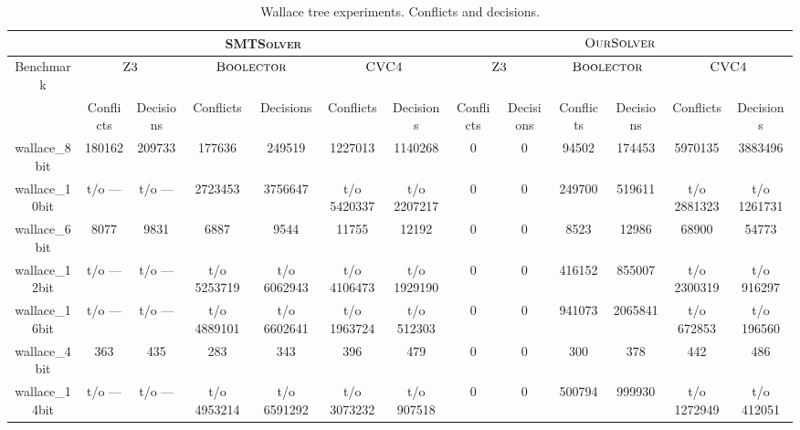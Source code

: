 \begin{table}[t]
\centering
\caption{Wallace tree experiments. Conflicts and decisions.}
\label{my-label}
\begin{tabular}{|c|c|c|c|c|c|c|c|c|c|c|c|c|}
\hline
               & \multicolumn{6}{c|}{\textsc{SMTSolver}}                                                            & \multicolumn{6}{c|}{$\textsc{OurSolver}$}                                                                      \\ \hline
Benchmark      & \multicolumn{2}{c|}{$\textsc{Z3}$} & \multicolumn{2}{c|}{$\textsc{Boolector}$} & \multicolumn{2}{c|}{$\textsc{CVC4}$} & \multicolumn{2}{c|}{$\textsc{Z3}$} & \multicolumn{2}{c|}{$\textsc{Boolector}$} & \multicolumn{2}{c|}{$\textsc{CVC4}$} \\ \hline
               & Conflicts      & Decisions     & Conflicts       & Decisions       & Conflicts      & Decisions      & Conflicts      & Decisions     & Conflicts       & Decisions       & Conflicts      & Decisions      \\ \hline
wallace\_8bit  & 180162         & 209733        & 177636          & 249519          & 1227013        & 1140268        & 0              & 0             & 94502           & 174453          & 5970135        & 3883496        \\ \hline
wallace\_10bit & t/o ---        & t/o ---       & 2723453         & 3756647         & t/o 5420337    & t/o 2207217    & 0              & 0             & 249700          & 519611          & t/o 2881323    & t/o 1261731    \\ \hline
wallace\_6bit  & 8077           & 9831          & 6887            & 9544            & 11755          & 12192          & 0              & 0             & 8523            & 12986           & 68900          & 54773          \\ \hline
wallace\_12bit & t/o ---        & t/o ---       & t/o 5253719     & t/o 6062943     & t/o 4106473    & t/o 1929190    & 0              & 0             & 416152          & 855007          & t/o 2300319    & t/o 916297     \\ \hline
wallace\_16bit & t/o ---        & t/o ---       & t/o 4889101     & t/o 6602641     & t/o 1963724    & t/o 512303     & 0              & 0             & 941073          & 2065841         & t/o 672853     & t/o 196560     \\ \hline
wallace\_4bit  & 363            & 435           & 283             & 343             & 396            & 479            & 0              & 0             & 300             & 378             & 442            & 486            \\ \hline
wallace\_14bit & t/o ---        & t/o ---       & t/o 4953214     & t/o 6591292     & t/o 3073232    & t/o 907518     & 0              & 0             & 500794          & 999930          & t/o 1272949    & t/o 412051     \\ \hline
\end{tabular}
\end{table}

